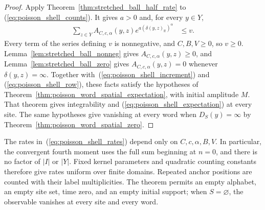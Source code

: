 \begin{proof}
    \leanok
    Apply Theorem~\ref{thm:stretched_ball_half_rate} to
    (\ref{eq:poisson_shell_counts}).  It gives $a>0$ and, for every
    $y\in Y$,
    \begin{align}
        \sum_{z\in Y}A_{C,c,\alpha}(y,z)
        e^{a(\delta(y,z)_{\mathbb R})^\alpha}
         & \leq v.
        \label{eq:poisson_shell_row}
    \end{align}
    Every term of the series defining $v$ is nonnegative, and
    $C,B,V\geq0$, so $v\geq0$.
    Lemma~\ref{lem:stretched_ball_nonneg} gives
    $A_{C,c,\alpha}(y,z)\geq0$, and
    Lemma~\ref{lem:stretched_ball_zero} gives
    $A_{C,c,\alpha}(y,z)=0$ whenever $\delta(y,z)=\infty$.
    Together with~(\ref{eq:poisson_shell_increment}) and
    (\ref{eq:poisson_shell_row}), these facts satisfy the hypotheses
    of Theorem~\ref{thm:poisson_word_spatial_expectation}, with initial
    amplitude $M$.  That theorem gives integrability and
    (\ref{eq:poisson_shell_expectation}) at every site.
    The same hypotheses give vanishing at every word when
    $D_S(y)=\infty$ by Theorem~\ref{thm:poisson_word_spatial_zero}.
\end{proof}

The rates in~(\ref{eq:poisson_shell_rates}) depend only on
$C,c,\alpha,B,V$.  In particular, the convergent fourth moment
uses the full sum beginning at $n=0$, and there is no factor of
$|I|$ or $|Y|$.  Fixed kernel parameters and quadratic counting
constants therefore give rates uniform over finite domains.
Repeated anchor positions are counted with their label multiplicities.
The theorem permits an empty alphabet, an empty site set, time zero,
and an empty initial support; when $S=\varnothing$, the observable
vanishes at every site and every word.
